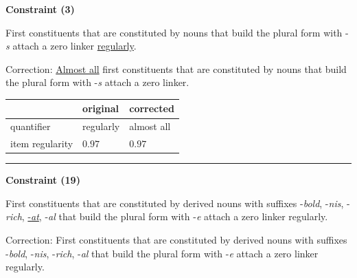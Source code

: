 \vspace{0.6em}

\begin{center}
\textbf{Constraint (3)}
\end{center}

\noindent
First constituents that are constituted by nouns that build the plural form with -\textit{s} attach a zero linker \underline{regularly}.
\vspace{0.3em}

\noindent
Correction: \underline{Almost all} first constituents that are constituted by nouns that build the plural form with -\textit{s} attach a zero linker.

\vspace{-0.25em}

\begin{table}[!ht]

\begin{center}

\begin{tabularx}{\columnwidth}{|X|X|X|}
      \hline
                        & original      & corrected \\
      \hline
      quantifier        & regularly      & almost all   \\
      \hline
      item regularity   & $0.97$      & $0.97$   \\
      \hline
\end{tabularx}
\end{center}
\end{table}

\vspace{-0.75em}
\hrule



\newpage

\vspace{0.6em}

\begin{center}
\textbf{Constraint (19)}
\end{center}

\noindent
First constituents that are constituted by derived nouns with suffixes -\textit{bold}, -\textit{nis}, -\textit{rich}, \underline{-\textit{at}}, -\textit{al} that build the plural form with -\textit{e} attach a zero linker regularly.
\vspace{0.3em}

\noindent
Correction: First constituents that are constituted by derived nouns with suffixes -\textit{bold}, -\textit{nis}, -\textit{rich}, -\textit{al} that build the plural form with -\textit{e} attach a zero linker regularly.

